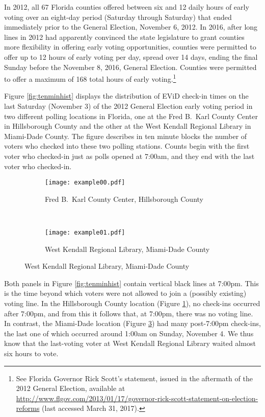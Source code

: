 \documentclass[12pt,titlepage]{article}
\begin{document}
In 2012, all 67  Florida counties offered between six and 12 daily
hours of early voting over an eight-day period (Saturday through
Saturday) that ended immediately prior to the General Election,
November 6, 2012.  In 2016, after long lines in 2012 had apparently
convinced the state legislature to grant counties more flexibility in
offering early voting opportunities, counties were permitted to offer
up to 12 hours of early voting per day, spread over 14 days, ending
the final Sunday before the November 8, 2016, General Election.
Counties were permitted to offer a maximum of 168 total hours of early
voting.\footnote{See Florida Governor Rick Scott's statement, issued
  in the aftermath of the 2012 General Election, available at
  \url{http://www.flgov.com/2013/01/17/governor-rick-scott-statement-on-election-reforms}
  (last accessed March 31, 2017).}

Figure \ref{fig:tenminhist} displays the distribution of EViD check-in
times on the last Saturday (November 3) of the 2012 General Election
early voting period in two different polling locations in Florida, one
at the Fred B.\ Karl County Center in Hillsborough County and the
other at the West Kendall Regional Library in Miami-Dade County. The
figure describes in ten minute blocks the number of voters who checked
into these two polling stations. Counts begin with the first voter who
checked-in just as polls opened at 7:00am, and they end with the last
voter who checked-in.

\begin{figure}[!ht]
  \caption{Early voting check-in times on Saturday, November 3, 2012,
    in two locations}
  \label{fig:tenminhist}
  \centering
  \begin{subfigure}[b]{\linewidth}
    \centering\texttt{[image: example00.pdf]}
    \caption{Fred B.\ Karl County Center, Hillsborough County}
    \label{fig:karlexample}
  \end{subfigure}%
  \\
  \begin{subfigure}[b]{\linewidth}
    \centering\texttt{[image: example01.pdf]}
    \caption{West Kendall Regional Library, Miami-Dade County}
    \label{fig:kendallexample}
  \end{subfigure}
\end{figure}

Both panels in Figure \ref{fig:tenminhist} contain vertical black
lines at 7:00pm. This is the time beyond which voters were not allowed
to join a (possibly existing) voting line. In the Hillsborough County
location (Figure \ref{fig:karlexample}), no check-ins occurred after
7:00pm, and from this it follows that, at 7:00pm, there was no voting
line. In contrast, the Miami-Dade location (Figure
\ref{fig:kendallexample}) had many post-7:00pm check-ins, the last one
of which occurred around 1:00am on Sunday, November 4. We thus know
that the last-voting voter at West Kendall Regional Library waited
almost six hours to vote.
\end{document}
